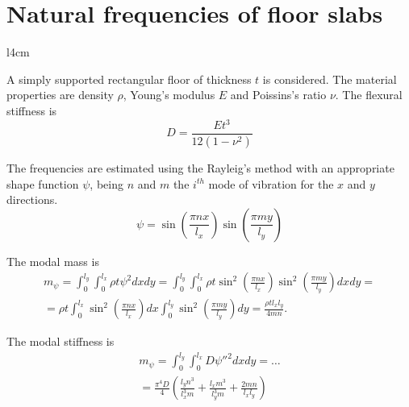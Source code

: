 \documentclass{article}
\begin{document}
\section*{Natural frequencies of floor slabs}

\begin{wrapfigure}{l}{4cm}
\vspace{-1em}
\end{wrapfigure}

A simply supported rectangular floor of thickness $t$ is considered. The material properties are density $\rho$, Young's modulus $E$ and Poissins's ratio $\nu$. The flexural stiffness is
$$
D = \frac{Et^3}{12(1-\nu^2)}
$$

The frequencies are estimated using the Rayleig's method with an appropriate shape function $\psi$, being $n$ and $m$ the $i^{th}$ mode of vibration for the $x$ and $y$ directions.
$$
\psi = \sin\left(\frac{\pi nx}{l_x}\right) \sin\left(\frac{\pi my}{l_y}\right)
$$

The modal mass is
\begin{multline*}
m_\psi = \int_0^{l_y}\int_0^{l_x} \rho t \psi^2 dxdy =
\int_0^{l_y}\int_0^{l_x} \rho t \sin^2\left(\frac{\pi nx}{l_x}\right) \sin^2\left(\frac{\pi my}{l_y}\right) dxdy = \\
= \rho t \int_0^{l_x} \sin^2\left(\frac{\pi nx}{l_x}\right) dx \int_0^{l_y} \sin^2\left(\frac{\pi my}{l_y}\right) dy =
\frac{\rho t l_x l_y}{4mn}.
\end{multline*}

The modal stiffness is
\begin{multline*}
m_\psi = \int_0^{l_y}\int_0^{l_x} D \psi''^2 dxdy = \dots\\
= \frac{\pi^4D}{4}\left(\frac{l_yn^3}{l_x^3m} + \frac{l_xm^3}{l_y^3m} + \frac{2mn}{l_xl_y}\right)
\end{multline*}


\end{document}
